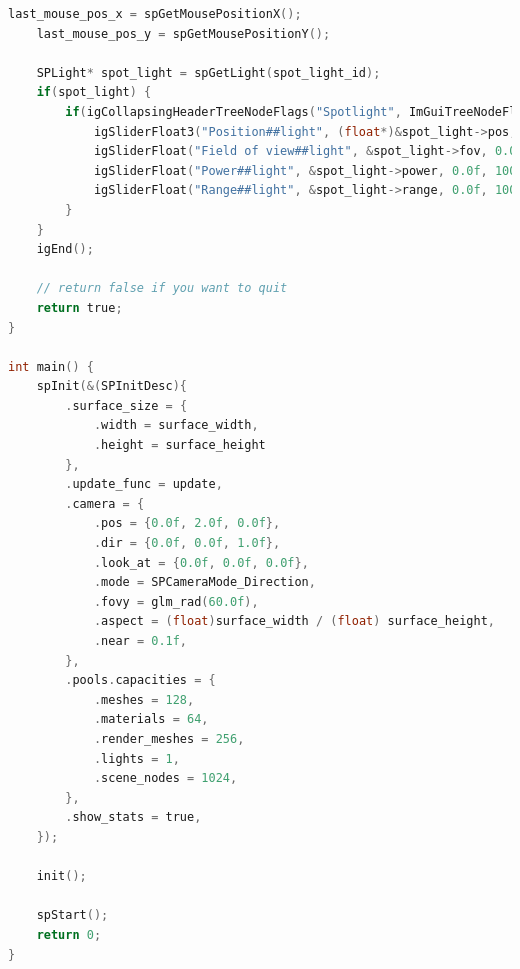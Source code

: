 \documentclass[oneside]{ausarbeitung}
\begin{document}
\begin{lstlisting}[language=C, label={lst:full_example}, caption={Kompletter C99-Quellcode zur Erstellung einer interaktiven 3D-Szene mit der \textbf{spider}-Engine}]
    last_mouse_pos_x = spGetMousePositionX();
    last_mouse_pos_y = spGetMousePositionY();
    
    SPLight* spot_light = spGetLight(spot_light_id);
    if(spot_light) {
        if(igCollapsingHeaderTreeNodeFlags("Spotlight", ImGuiTreeNodeFlags_None)) {
            igSliderFloat3("Position##light", (float*)&spot_light->pos, -50.0f, 50.0f, "%.1f", 1.0f);
            igSliderFloat("Field of view##light", &spot_light->fov, 0.0f, M_PI, "%.2f", 1.0f);
            igSliderFloat("Power##light", &spot_light->power, 0.0f, 1000.0f, "%.0f", 1.0f);
            igSliderFloat("Range##light", &spot_light->range, 0.0f, 1000.0f, "%.0f", 1.0f);
        }
    }
    igEnd();

    // return false if you want to quit
    return true;
}

int main() {
    spInit(&(SPInitDesc){
        .surface_size = {
            .width = surface_width,
            .height = surface_height
        },
        .update_func = update,
        .camera = {
            .pos = {0.0f, 2.0f, 0.0f},
            .dir = {0.0f, 0.0f, 1.0f},
            .look_at = {0.0f, 0.0f, 0.0f},
            .mode = SPCameraMode_Direction,
            .fovy = glm_rad(60.0f),
            .aspect = (float)surface_width / (float) surface_height,
            .near = 0.1f,
        },
        .pools.capacities = {
            .meshes = 128,
            .materials = 64,
            .render_meshes = 256,
            .lights = 1,
            .scene_nodes = 1024,
        },
        .show_stats = true,
    });

    init();

    spStart();
    return 0;
}
\end{lstlisting}

\end{document}
